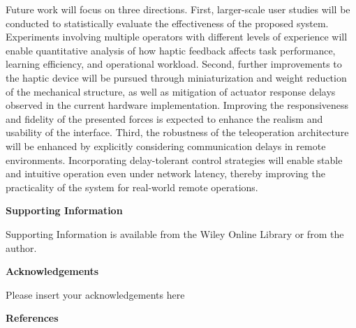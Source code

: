 \documentclass{WileyMSP-template}
\begin{document}
Future work will focus on three directions. First, larger-scale user studies will be conducted to statistically evaluate the effectiveness of the proposed system. 
Experiments involving multiple operators with different levels of experience will enable quantitative analysis of how haptic feedback affects task performance, learning efficiency, and operational workload. 
Second, further improvements to the haptic device will be pursued through miniaturization and weight reduction of the mechanical structure, as well as mitigation of actuator response delays observed in the current hardware implementation. 
Improving the responsiveness and fidelity of the presented forces is expected to enhance the realism and usability of the interface. 
Third, the robustness of the teleoperation architecture will be enhanced by explicitly considering communication delays in remote environments. 
Incorporating delay-tolerant control strategies will enable stable and intuitive operation even under network latency, thereby improving the practicality of the system for real-world remote operations.

\medskip
\textbf{Supporting Information} \par %
Supporting Information is available from the Wiley Online Library or from the author.

\medskip
\textbf{Acknowledgements} \par %
Please insert your acknowledgements here

\medskip

%
%
%

\textbf{References}\\


\end{document}
